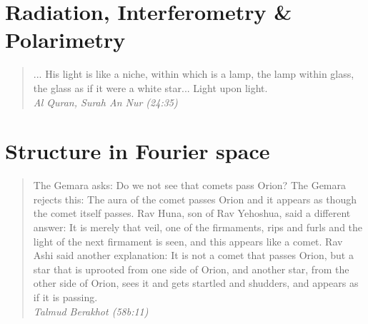 \documentclass[12pt,twoside,openany]{book}
\newcommand{\singlespaced}{\renewcommand{\baselinestretch}{1}\normalfont}
\newcommand{\halfspaced}{\renewcommand{\baselinestretch}{1.5}\normalfont}
\begin{document}
\vspace*{\fill}

\newpage

\singlespaced
\tableofcontents


\newpage
{}
{}
\listoftables

\newpage
{}
\listoffigures


\halfspaced
\setlength{\parindent}{0.25in}



\mainmatter
\part{Radiation, Interferometry \& Polarimetry}

\vspace*{\fill} 
\begin{quote} 
\centering 
... His light is like a niche, within which is a lamp, the lamp within glass, the glass as if it were a white star... Light upon light.\\
\textit{Al Quran, Surah An Nur (24:35)}
\end{quote}
\vspace*{\fill}

%
%
%
%
%
%

%
%
%

%
%
\part{Structure in Fourier space}

\vspace*{\fill} 
\begin{quote} 
\centering 
The Gemara asks: Do we not see that comets pass Orion? The Gemara rejects this: The aura of the comet passes Orion and it appears as though the comet itself passes. Rav Huna, son of Rav Yehoshua, said a different answer: It is merely that veil, one of the firmaments, rips and furls and the light of the next firmament is seen, and this appears like a comet. Rav Ashi said another explanation: It is not a comet that passes Orion, but a star that is uprooted from one side of Orion, and another star, from the other side of Orion, sees it and gets startled and shudders, and appears as if it is passing.\\

\textit{Talmud Berakhot (58b:11)}
\end{quote}
\vspace*{\fill}
\end{document}

